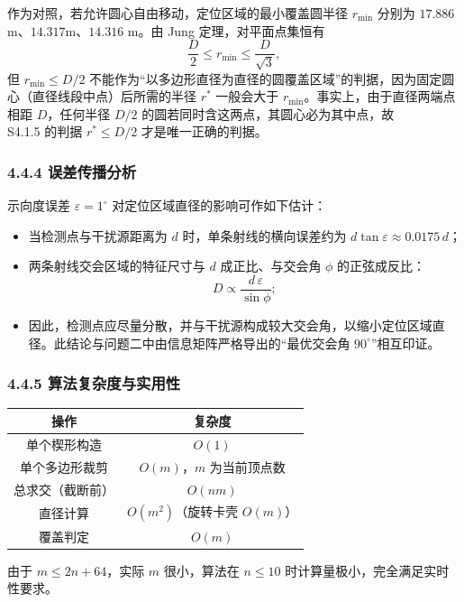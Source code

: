 \documentclass[UTF8, zihao=5,AutoFakeBold=2]{ctexart}
\begin{document}
	作为对照，若允许圆心自由移动，定位区域的最小覆盖圆半径 \(r_{\min}\) 分别为 \(17.886\)m、\(14.317\)m、\(14.316\) m。由 Jung 定理，对平面点集恒有
	\[
		\frac{D}{2}\le r_{\min}\le\frac{D}{\sqrt3},
	\]
	但 \(r_{\min}\le D/2\) 不能作为“以多边形直径为直径的圆覆盖区域”的判据，因为固定圆心（直径线段中点）后所需的半径 \(r^*\) 一般会大于 \(r_{\min}\)。事实上，由于直径两端点相距 \(D\)，任何半径 \(D/2\) 的圆若同时含这两点，其圆心必为其中点，故 \\S4.1.5 的判据 \(r^*\le D/2\) 才是唯一正确的判据。

	\subsubsection*{4.4.4 误差传播分析}

	示向度误差 \(\varepsilon=1^\circ\) 对定位区域直径的影响可作如下估计：
	\begin{itemize}
		\item 当检测点与干扰源距离为 \(d\) 时，单条射线的横向误差约为 \(d\tan\varepsilon\approx0.0175\,d\)；
		\item 两条射线交会区域的特征尺寸与 \(d\) 成正比、与交会角 \(\phi\) 的正弦成反比：
		\[
			D\propto\frac{d\,\varepsilon}{\sin\phi};
		\]
		\item 因此，检测点应尽量分散，并与干扰源构成较大交会角，以缩小定位区域直径。此结论与问题二中由信息矩阵严格导出的“最优交会角 \(90^\circ\)”相互印证。
	\end{itemize}

	\subsubsection*{4.4.5 算法复杂度与实用性}

	\begin{table}[H]
		\centering
		\begin{tabular}{cc}
			\toprule
			操作 & 复杂度 \\
			\midrule
			单个楔形构造 & \(O(1)\) \\
			单个多边形裁剪 & \(O(m)\)，\(m\) 为当前顶点数 \\
			总求交（截断前） & \(O(nm)\) \\
			直径计算 & \(O(m^2)\)（旋转卡壳 \(O(m)\)） \\
			覆盖判定 & \(O(m)\) \\
			\bottomrule
		\end{tabular}
	\end{table}

	由于 \(m\le2n+64\)，实际 \(m\) 很小，算法在 \(n\le10\) 时计算量极小，完全满足实时性要求。
\end{document}
